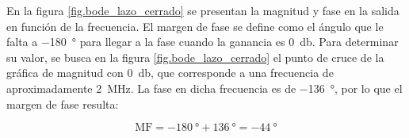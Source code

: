 


En la figura \ref{fig.bode_lazo_cerrado} se presentan la magnitud y fase en la salida en función de la frecuencia.
El margen de fase se define como el ángulo que le falta a \SI{-180}{\degree} para llegar a la fase cuando la ganancia es \SI{0}{\decibel}. Para determinar su valor, se busca en la figura \ref{fig.bode_lazo_cerrado} el punto de cruce de la gráfica de magnitud con \SI{0}{\decibel}, que corresponde a una frecuencia de aproximadamente \SI{2}{\mega\hertz}.  La fase en dicha frecuencia es de \SI{-136}{\degree}, por lo que el margen de fase resulta:

	$$ \mathrm{MF} = \SI{-180}{\degree} + \SI{136}{\degree} = \boxed{\SI{-44}{\degree}} $$
